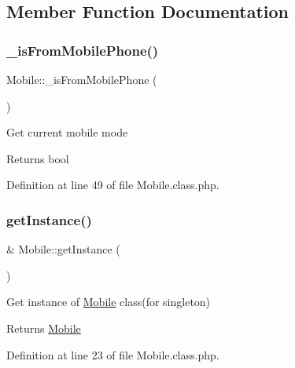 \subsection{Member Function Documentation}
\mbox{\label{classMobile_a5f539dee62a4a3e83db1df0f2d9573e4}} 
\subsubsection{\texorpdfstring{\+\_\+is\+From\+Mobile\+Phone()}{\_isFromMobilePhone()}}
{\footnotesize\ttfamily Mobile\+::\+\_\+is\+From\+Mobile\+Phone (\begin{DoxyParamCaption}{ }\end{DoxyParamCaption})}

Get current mobile mode

\begin{DoxyReturn}{Returns}
bool 
\end{DoxyReturn}


Definition at line 49 of file Mobile.\+class.\+php.

\mbox{\label{classMobile_a303f0bf07eb32a56769009c12c70d954}} 
\subsubsection{\texorpdfstring{get\+Instance()}{getInstance()}}
{\footnotesize\ttfamily \& Mobile\+::get\+Instance (\begin{DoxyParamCaption}{ }\end{DoxyParamCaption})}

Get instance of \hyperlink{classMobile}{Mobile} class(for singleton)

\begin{DoxyReturn}{Returns}
\hyperlink{classMobile}{Mobile} 
\end{DoxyReturn}


Definition at line 23 of file Mobile.\+class.\+php.

\mbox{\label{classMobile_a9978671e8463a94130a6733f2d0fa0a4}} 
